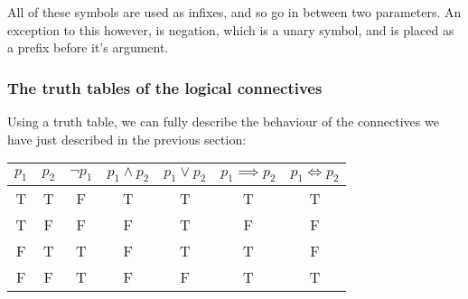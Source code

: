 \documentclass{article}
\begin{document}
All of these symbols are used as infixes, and so go in between two parameters. An
exception to this however, is negation, which is a unary symbol, and is placed
as a prefix before it's argument.

\subsubsection{The truth tables of the logical connectives}

Using a truth table, we can fully describe the behaviour of the connectives we
have just described in the previous section:

\begin{center}
	\begin{tabular}{|c|c|c|c|c|c|c|}
		\hline
		$p_1$& $p_2$& $\neg p_1$& $p_1 \wedge p_2$& $p_1 \vee p_2$& $p_1 \implies p_2$& $p_1 \iff p_2$\\ \hline
		T& T& F& T &T &T &T\\
		T& F& F& F &T &F &F\\
		F& T& T& F &T &T &F\\
		F& F& T& F &F &T &T\\ \hline
	\end{tabular}
\end{center}
\end{document}
